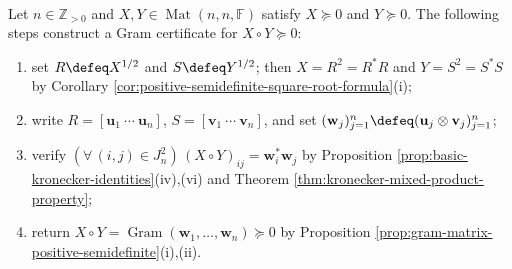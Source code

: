 \begin{proofmethod} \label{meth:schur-product-positivity} \\
Let $n\in\mathbb{Z}_{>0}$ and $X,Y\in\operatorname{Mat}(n,n,\mathbb{F})$ satisfy $X\succeq0$ and $Y\succeq0$. The following steps construct a Gram certificate for $X\circ Y\succeq0$:
\begin{enumerate}[label=(\roman*)]
\setlength{\itemsep}{0pt}
\item set $R\defeq X^{1/2}$ and $S\defeq Y^{1/2}$; then $X=R^2=R^*R$ and $Y=S^2=S^*S$ by Corollary \ref{cor:positive-semidefinite-square-root-formula}(i);
\item write $R=[\mathbf{u}_1\ \cdots\ \mathbf{u}_n]$, $S=[\mathbf{v}_1\ \cdots\ \mathbf{v}_n]$, and set $(\mathbf{w}_j)_{j=1}^{n}\defeq(\mathbf{u}_j\otimes\mathbf{v}_j)_{j=1}^{n}$;
\item verify $(\forall\,(i,j)\in J_n^2)\,(X\circ Y)_{ij}=\mathbf{w}_i^*\mathbf{w}_j$ by Proposition \ref{prop:basic-kronecker-identities}(iv),(vi) and Theorem \ref{thm:kronecker-mixed-product-property};
\item return $X\circ Y=\operatorname{Gram}(\mathbf{w}_1,\ldots,\mathbf{w}_n)\succeq0$ by Proposition \ref{prop:gram-matrix-positive-semidefinite}(i),(ii).
\end{enumerate}
\end{proofmethod}
